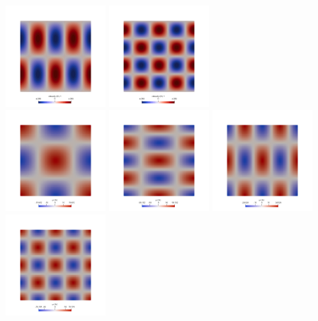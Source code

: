 \begin{center}
\includegraphics[width=3.74cm]{python_codes/fieldstone_32/results/v_2x1}
\includegraphics[width=3.74cm]{python_codes/fieldstone_32/results/v_2x2}\\
\includegraphics[width=3.74cm]{python_codes/fieldstone_32/results/p_1x1}
\includegraphics[width=3.74cm]{python_codes/fieldstone_32/results/p_1x2}
\includegraphics[width=3.74cm]{python_codes/fieldstone_32/results/p_2x1}
\includegraphics[width=3.74cm]{python_codes/fieldstone_32/results/p_2x2}\\

\end{center}
